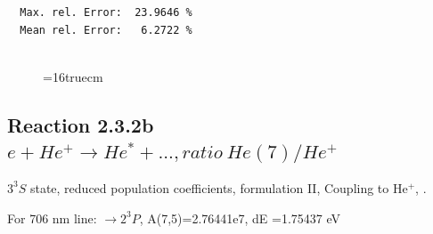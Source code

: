 \documentclass[12pt,dvips]{article}
\begin{document}
\begin{small}
\begin{verbatim}
  Max. rel. Error:  23.9646 %
  Mean rel. Error:   6.2722 %


\end{verbatim}\end{small}
\begin{figure} \label{2.3.2a}
\epsfxsize=16truecm
\end{figure}
\newpage


\subsection{
  Reaction 2.3.2b $e + He^+ \rightarrow He^* + ...,  ratio ~ He(7)/He^+$
}

  $3^3S$ state,
  reduced population coefficients, formulation II,
  Coupling to He$^+$, \cite{kn:Fujimoto}.

  For 706 nm line: $\rightarrow 2^3P$, A(7,5)=2.76441e7, dE =1.75437 eV
\end{document}
